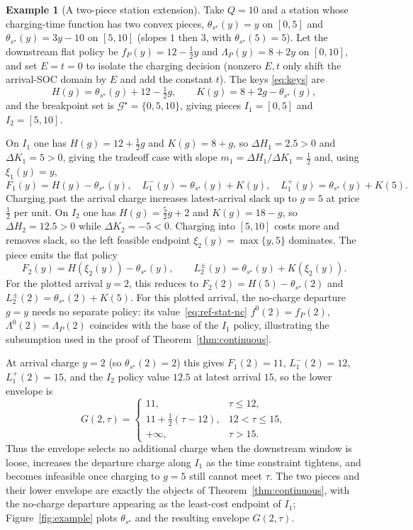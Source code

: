 \documentclass[review,3p,authoryear]{elsarticle}
\theoremstyle{plain}
\theoremstyle{definition}
\newtheorem{example}{Example}
\theoremstyle{remark}
\begin{document}
\begin{example}[A two-piece station extension]
\label{ex:station}
Take $Q=10$ and a station whose charging-time function has two convex pieces,
$\theta_{s^\star}(y)=y$ on $[0,5]$ and $\theta_{s^\star}(y)=3y-10$ on $[5,10]$ (slopes
$1$ then $3$, with $\theta_{s^\star}(5)=5$). Let the downstream flat policy be
$f_P(y)=12-\tfrac12 y$ and $\Lambda_P(y)=8+2y$ on $[0,10]$, and set $E=t=0$ to isolate
the charging decision (nonzero $E,t$ only shift the arrival-SOC domain by $E$ and add
the constant $t$). The keys \eqref{eq:keys} are
\[
H(g)=\theta_{s^\star}(g)+12-\tfrac12 g,\qquad
K(g)=8+2g-\theta_{s^\star}(g),
\]
and the breakpoint set is $\mathcal G^\star=\{0,5,10\}$, giving pieces $I_1=[0,5]$ and
$I_2=[5,10]$.

On $I_1$ one has $H(g)=12+\tfrac12 g$ and $K(g)=8+g$, so $\Delta H_1=2.5>0$ and
$\Delta K_1=5>0$, giving the tradeoff case with slope $m_1=\Delta H_1/\Delta K_1=\tfrac12$ and,
using \(\xi_1(y)=y\),
\[
F_1(y)=H(y)-\theta_{s^\star}(y),\quad
L_1^-(y)=\theta_{s^\star}(y)+K(y),\quad
L_1^+(y)=\theta_{s^\star}(y)+K(5).
\]
Charging past the arrival charge increases latest-arrival slack up to $g=5$ at price
$\tfrac12$ per unit. On $I_2$ one has $H(g)=\tfrac52 g+2$ and $K(g)=18-g$, so
$\Delta H_2=12.5>0$ while $\Delta K_2=-5<0$. Charging into $[5,10]$ costs more
and removes slack, so the left feasible endpoint
\(\xi_2(y)=\max\{y,5\}\) dominates. The piece emits the flat policy
\[
F_2(y)=H(\xi_2(y))-\theta_{s^\star}(y),\qquad
L_2^\pm(y)=\theta_{s^\star}(y)+K(\xi_2(y)).
\]
For the plotted arrival \(y=2\), this reduces to
\(F_2(2)=H(5)-\theta_{s^\star}(2)\) and
\(L_2^\pm(2)=\theta_{s^\star}(2)+K(5)\). For this plotted arrival, the no-charge
departure \(g=y\) needs no separate policy: its value~\eqref{eq:ref-stat-nc}
\(f^0(2)=f_P(2)\), \(\Lambda^0(2)=\Lambda_P(2)\) coincides with the base of the \(I_1\) policy,
illustrating the subsumption used in the proof of Theorem~\ref{thm:continuous}.

At arrival charge \(y=2\) (so \(\theta_{s^\star}(2)=2\)) this gives $F_1(2)=11$,
$L_1^-(2)=12$, $L_1^+(2)=15$, and the $I_2$ policy value $12.5$ at latest arrival $15$,
so the lower envelope is
\[
G(2,\tau)=
\begin{cases}
11, & \tau\le 12,\\
11+\tfrac12(\tau-12), & 12<\tau\le 15,\\
+\infty, & \tau>15.
\end{cases}
\]
Thus the envelope selects no additional charge when the downstream window is loose,
increases the departure charge along $I_1$ as the time constraint tightens, and becomes
infeasible once charging to $g=5$ still cannot meet $\tau$. The two
pieces and their lower envelope are exactly the objects of
Theorem~\ref{thm:continuous}, with the no-charge departure appearing as the least-cost
endpoint of $I_1$; Figure~\ref{fig:example} plots $\theta_{s^\star}$ and the
resulting envelope $G(2,\tau)$.
\end{example}
\end{document}
